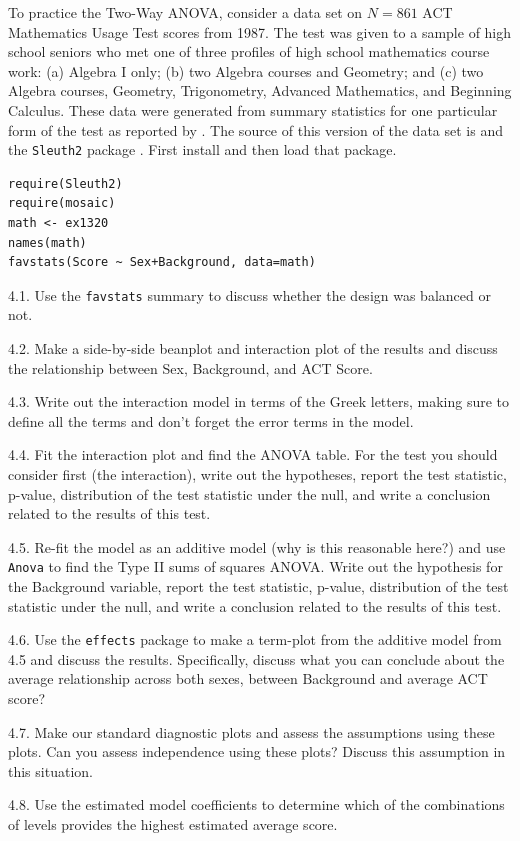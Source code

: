 \documentclass[]{book}
\theoremstyle{definition}
\theoremstyle{definition}
\theoremstyle{remark}
\begin{document}
To practice the Two-Way ANOVA, consider a data set on \(N=861\) ACT
Mathematics Usage Test scores from 1987. The test was given to a sample
of high school seniors who met one of three profiles of high school
mathematics course work: (a) Algebra I only; (b) two Algebra courses and
Geometry; and (c) two Algebra courses, Geometry, Trigonometry, Advanced
Mathematics, and Beginning Calculus. These data were generated from
summary statistics for one particular form of the test as reported by
\citet{Doolittle1989}. The source of this version of the data set is
\citet{Ramsey2012} and the \texttt{Sleuth2} package \citep{R-Sleuth2}.
First install and then load that package.

\begin{verbatim}
require(Sleuth2)
require(mosaic)
math <- ex1320
names(math)
favstats(Score ~ Sex+Background, data=math)
\end{verbatim}

4.1. Use the \texttt{favstats} summary to discuss whether the design was
balanced or not.

4.2. Make a side-by-side beanplot and interaction plot of the results
and discuss the relationship between Sex, Background, and ACT Score.

4.3. Write out the interaction model in terms of the Greek letters,
making sure to define all the terms and don't forget the error terms in
the model.

4.4. Fit the interaction plot and find the ANOVA table. For the test you
should consider first (the interaction), write out the hypotheses,
report the test statistic, p-value, distribution of the test statistic
under the null, and write a conclusion related to the results of this
test.

4.5. Re-fit the model as an additive model (why is this reasonable
here?) and use \texttt{Anova} to find the Type II sums of squares ANOVA.
Write out the hypothesis for the Background variable, report the test
statistic, p-value, distribution of the test statistic under the null,
and write a conclusion related to the results of this test.

4.6. Use the \texttt{effects} package to make a term-plot from the
additive model from 4.5 and discuss the results. Specifically, discuss
what you can conclude about the average relationship across both sexes,
between Background and average ACT score?

4.7. Make our standard diagnostic plots and assess the assumptions using
these plots. Can you assess independence using these plots? Discuss this
assumption in this situation.

4.8. Use the estimated model coefficients to determine which of the
combinations of levels provides the highest estimated average score.


\end{document}
